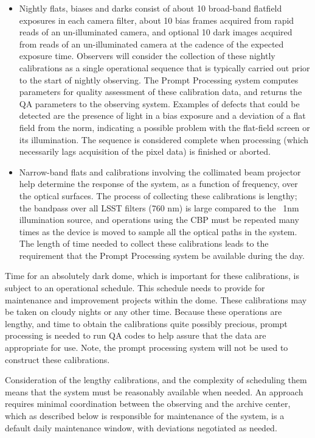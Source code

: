 \begin{itemize}

\item Nightly flats, biases and darks consist of about 10 broad-band
flatfield exposures in each camera filter, about 10 bias frames
acquired from rapid reads of an un-illuminated camera, and optional 10
dark images acquired from reads of an un-illuminated camera at the
cadence of the expected exposure time.  Observers will consider the
collection of these nightly calibrations as a single operational
sequence that is typically carried out prior to the start of nightly
observing.  The Prompt Processing system computes parameters for
quality assessment of these calibration data, and returns the QA
parameters to the observing system.  Examples of defects that could be
detected are the presence of light in a bias exposure and a deviation
of a flat field from the norm, indicating a possible problem with the
flat-field screen or its illumination.  The sequence is considered
complete when processing (which necessarily lags acquisition of the
pixel data) is finished or aborted.

\item Narrow-band flats and calibrations involving the collimated beam
projector help determine the response of the system, as a function of
frequency, over the optical surfaces.  The process of collecting these
calibrations is lengthy; the bandpass over all LSST filters (760 nm)
is large compared to the ~1nm illumination source, and operations
using the CBP must be repeated many times as the device is moved to
sample all the optical paths in the system.  The length of time needed
to collect these calibrations leads to the requirement that the Prompt
Processing system be available during the day. \\

\end{itemize}

Time for an absolutely dark dome, which is important for these
calibrations, is subject to an operational schedule.  This schedule
needs to provide for maintenance and improvement projects within the
dome.  These calibrations may be taken on cloudy nights or any other
time.  Because these operations are lengthy, and time to obtain the
calibrations quite possibly precious, prompt processing is needed to
run QA codes to help assure that the data are appropriate for
use. Note, the prompt processing system will not be used to construct
these calibrations.

Consideration of the lengthy calibrations, and the complexity of
scheduling them means that the system must be reasonably available
when needed. An approach requires minimal coordination between the
observing and the archive center, which as described below is
responsible for maintenance of the system, is a default daily
maintenance window, with deviations negotiated as needed.


